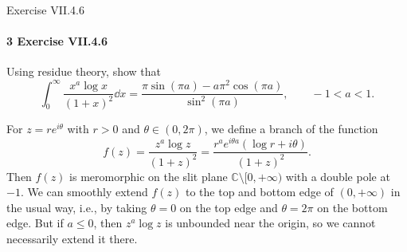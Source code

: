 \documentclass[12pt]{article}
\newenvironment{fullbox}{\begin{lrbox}{\savefullbox}\begin{minipage}{\dimexpr\textwidth-2\fboxsep\relax}}{\end{minipage}\end{lrbox}\begin{center}\framebox[\textwidth]{\usebox{\savefullbox}}\end{center}}
\newenvironment{pbox}[1][]{\begin{fullbox}\ifx#1\empty\else\paragraph{#1}\fi}{\end{fullbox}}
\theoremstyle{definition}
\newcommand{\C}{\mathbb{C}}
\begin{document}
\newpage
\begin{pbox}[3 Exercise VII.4.6]
    Using residue theory, show that
    \[
        \int_{0}^{\infty} \frac{x^a \log x}{(1 + x)^2} \dd{x} = \frac{\pi \sin(\pi a) - a\pi^2 \cos(\pi a)}{\sin^2(\pi a)}, \qquad -1 < a < 1.
    \]
\end{pbox}

For $z = re^{i\theta}$ with $r > 0$ and $\theta \in (0, 2\pi)$, we define a branch of the function
\[
    f(z)
        = \frac{z^a \log z}{(1 + z)^2}
        = \frac{r^ae^{i\theta a}(\log r + i\theta)}{(1 + z)^2}.
\]
Then $f(z)$ is meromorphic on the slit plane $\C \setminus [0, + \infty)$ with a double pole at $-1$. We can smoothly extend $f(z)$ to the top and bottom edge of $(0, +\infty)$ in the usual way, i.e., by taking $\theta = 0$ on the top edge and $\theta = 2\pi$ on the bottom edge. But if $a \leq 0$, then $z^a\log z$ is unbounded near the origin, so we cannot necessarily extend it there.
\end{document}
